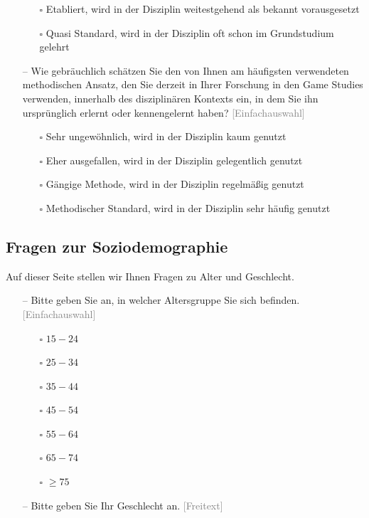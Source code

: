 \documentclass{scrartcl}
\begin{document}
\begin{itemize}
\begin{itemize}
      \item[$\square$] Etabliert, wird in der Disziplin weitestgehend als bekannt vorausgesetzt
      \item[$\square$] Quasi Standard, wird in der Disziplin oft schon im Grundstudium gelehrt
   \end{itemize}
   \item[--] Wie gebräuchlich schätzen Sie den von Ihnen am häufigsten verwendeten methodischen Ansatz, den Sie derzeit in Ihrer Forschung in den Game Studies verwenden, innerhalb des disziplinären Kontexts ein, in dem Sie ihn ursprünglich erlernt oder kennengelernt haben? \textcolor{gray}{\textsf{[Einfachauswahl]}}
   \begin{itemize}
      \item[$\square$] Sehr ungewöhnlich, wird in der Disziplin kaum genutzt
      \item[$\square$] Eher ausgefallen, wird in der Disziplin gelegentlich genutzt
      \item[$\square$] Gängige Methode, wird in der Disziplin regelmäßig genutzt
      \item[$\square$] Methodischer Standard, wird in der Disziplin sehr häufig genutzt
   \end{itemize}
\end{itemize}


\subsection*{Fragen zur Soziodemographie}
Auf dieser Seite stellen wir Ihnen Fragen zu Alter und Geschlecht.

\begin{itemize}
   \item[--] Bitte geben Sie an, in welcher Altersgruppe Sie sich befinden. \textcolor{gray}{\textsf{[Einfachauswahl]}}
   \begin{itemize}
      \item[$\square$] $15-24$
      \item[$\square$] $25-34$
      \item[$\square$] $35-44$
      \item[$\square$] $45-54$
      \item[$\square$] $55-64$
      \item[$\square$] $65-74$
      \item[$\square$] $\geq75$
   \end{itemize}
   \item[--] Bitte geben Sie Ihr Geschlecht an. \textcolor{gray}{\textsf{[Freitext]}}
\end{itemize}
\end{document}
